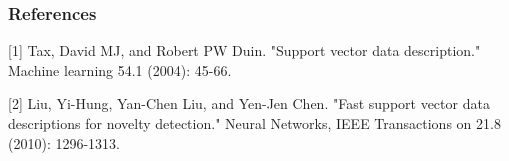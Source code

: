 \documentclass{article} %
\begin{document}










\subsubsection*{References}

\small{
[1] Tax, David MJ, and Robert PW Duin. "Support vector data description." Machine learning 54.1 (2004): 45-66. 

[2] Liu, Yi-Hung, Yan-Chen Liu, and Yen-Jen Chen. "Fast support vector data descriptions for novelty detection." Neural Networks, IEEE Transactions on 21.8 (2010): 1296-1313.

}
\end{document}
